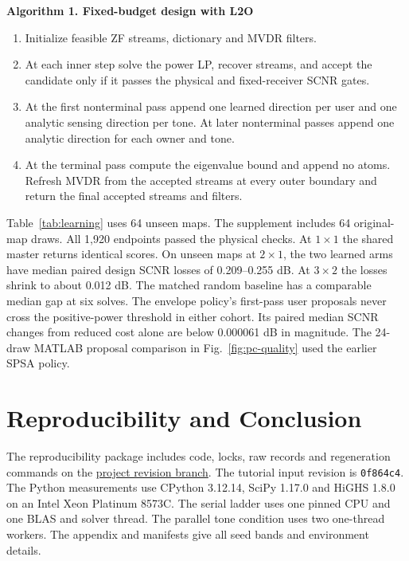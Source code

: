 \documentclass[journal]{IEEEtran}
\begin{document}
\smallskip\noindent\begin{minipage}{\columnwidth}\footnotesize
\textbf{Algorithm 1. Fixed-budget design with L2O}
\begin{enumerate}
 \setlength{\itemsep}{0pt}\setlength{\parsep}{0pt}
 \item Initialize feasible ZF streams, dictionary and MVDR filters.
 \item At each inner step solve the power LP, recover streams, and accept the candidate only if it passes the physical and fixed-receiver SCNR gates.
 \item At the first nonterminal pass append one learned direction per user and one analytic sensing direction per tone. At later nonterminal passes append one analytic direction for each owner and tone.
 \item At the terminal pass compute the eigenvalue bound and append no atoms. Refresh MVDR from the accepted streams at every outer boundary and return the final accepted streams and filters.
\end{enumerate}
\end{minipage}\par\smallskip

Table~\ref{tab:learning} uses 64 unseen maps. The supplement includes 64 original-map draws. All 1,920 endpoints passed the physical checks. At \(1\times1\) the shared master returns identical scores. On unseen maps at \(2\times1\), the two learned arms have median paired design SCNR losses of 0.209--0.255 dB. At \(3\times2\) the losses shrink to about 0.012 dB. The matched random baseline has a comparable median gap at six solves. The envelope policy's first-pass user proposals never cross the positive-power threshold in either cohort. Its paired median SCNR changes from reduced cost alone are below 0.000061 dB in magnitude. The 24-draw MATLAB proposal comparison in Fig.~\ref{fig:pc-quality} used the earlier SPSA policy.

\section{Reproducibility and Conclusion}
The reproducibility package includes code, locks, raw records and regeneration commands on the \href{https://github.com/muneefo/clutter_aware_beamforming-for-ISAC/tree/letters-revision}{project revision branch}. The tutorial input revision is \texttt{0f864c4}. The Python measurements use CPython 3.12.14, SciPy 1.17.0 and HiGHS 1.8.0 on an Intel Xeon Platinum 8573C. The serial ladder uses one pinned CPU and one BLAS and solver thread. The parallel tone condition uses two one-thread workers. The appendix and manifests give all seed bands and environment details.
\end{document}
